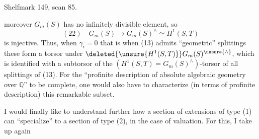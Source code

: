 Shelfmark 149, scan 85.

moreover $G_m(S)$ has no infinitely divisible element, so
\[
(22)\quad G_m(S)\longrightarrow G_m(S)^\wedge\simeq H^1(S,T)
\]
is injective. Thus, when $\gamma_i=0$ that is when (13) admits ``geometric'' splittings  these form a torsor under $\deleted{\unsure{H^1(S,T)}}G_m(S)^{\unsure{\wedge}}$, which is identified with a subtorsor of the $(H^1(S,T)=G_m(S)^\wedge)$-torsor of all splittings of (13). For the ``profinite description of absolute algebraic geometry over $\mathbb Q$'' to be complete, one would also have to characterize (in terms of  profinite description) this remarkable subset.

I would finally like to understand further how a section of extensions of type (1) can ``specialize'' to a section of type (2), in the case of  valuation. For this, I take up again
